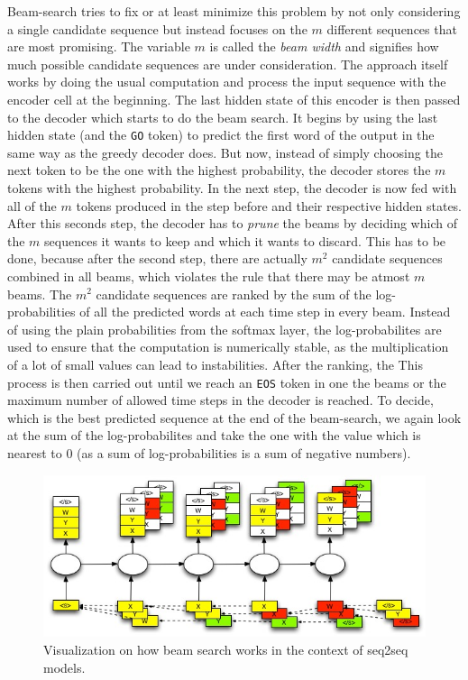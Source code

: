 Beam-search tries to fix or at least minimize this problem by not only considering a single candidate sequence but instead focuses on the $m$ different sequences that are most promising. The variable $m$ is called the \emph{beam width} and signifies how much possible candidate sequences are under consideration. The approach itself works by doing the usual computation and process the input sequence with the encoder cell at the beginning. The last hidden state of this encoder is then passed to the decoder which starts to do the beam search. It begins by using the last hidden state (and the \texttt{GO} token) to predict the first word of the output in the same way as the greedy decoder does. But now, instead of simply choosing the next token to be the one with the highest probability, the decoder stores the $m$ tokens with the highest probability. In the next step, the decoder is now fed with all of the $m$ tokens produced in the step before and their respective hidden states. After this seconds step, the decoder has to \emph{prune} the beams by deciding which of the $m$ sequences it wants to keep and which it wants to discard. This has to be done, because after the second step, there are actually $m^2$ candidate sequences combined in all beams, which violates the rule that there may be atmost $m$ beams. The $m^2$ candidate sequences are ranked by the sum of the log-probabilities of all the predicted words at each time step in every beam. Instead of using the plain probabilities from the softmax layer, the log-probabilites are used to ensure that the computation is numerically stable, as the multiplication of a lot of small values can lead to instabilities. After the ranking, the  This process is then carried out until we reach an \texttt{EOS} token in one the beams or the maximum number of allowed time steps in the decoder is reached. To decide, which is the best predicted sequence at the end of the beam-search, we again look at the sum of the log-probabilites and take the one with the value which is nearest to $0$ (as a sum of log-probabilities is a sum of negative numbers).

\begin{figure}[H]
	\label{fundamentals:seq2seq:beam_search}
	\centering
	\includegraphics[width=12cm]{img/beam_search_visualization}
	\caption{Visualization on how beam search works in the context of seq2seq models.\protect\footnotemark}
\end{figure}

